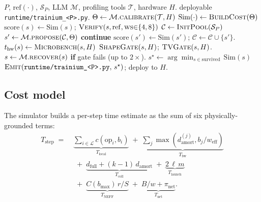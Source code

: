 \begin{algorithm}[!htbp]
\caption{End-to-end closed-stack collective-strategy search.}
\label{alg:pipeline}
\begin{algorithmic}[1]
\Require $P$, $\mathrm{ref}(\cdot)$, $\mathcal{S}_P$,
LLM $\mathcal{M}$, profiling tools $\mathcal{T}$, hardware $H$.
\Ensure deployable \texttt{runtime/trainium\_<P>.py}.
\smallskip
\State $\Theta \gets \mathcal{M}.\textsc{calibrate}(\mathcal{T}, H)$
\State $\mathrm{Sim}(\cdot) \gets \textsc{BuildCost}(\Theta)$
\smallskip
{}
  \State $\mathrm{score}(s) \gets \mathrm{Sim}(s)$;
  $\textsc{Verify}(s, \mathrm{ref}, \textsc{ws}{\in}\{4,8\})$
\EndFor
\smallskip
\State $\mathcal{C} \gets \textsc{InitPool}(\mathcal{S}_P)$
  \State $s' \gets \mathcal{M}.\textsc{propose}(\mathcal{C}, \Theta)$
   \textbf{continue} \EndIf
  \State $\mathrm{score}(s') \gets \mathrm{Sim}(s')$;
  $\mathcal{C} \gets \mathcal{C} \cup \{s'\}$.
\EndFor
\smallskip
{}
  \State $t_{\mathrm{hw}}(s) \gets \textsc{Microbench}(s, H)$
  \State $\textsc{ShapeGate}(s, H)$;
         $\textsc{TVGate}(s, H)$.
  \State $s \gets \mathcal{M}.\textsc{recover}(s)$ \textbf{if}
  gate fails (up to $2\times$).
\EndFor
\smallskip
\State $s^\star \gets \arg\min_{s \in \text{survived}}\,\mathrm{Sim}(s)$
\State $\textsc{Emit}(\texttt{runtime/trainium\_<P>.py},\, s^\star)$;
deploy to $H$.
\end{algorithmic}
\end{algorithm}

\subsection{Cost model}
\label{sec:cost}

The simulator builds a per-step time estimate as the sum of six
physically-grounded terms:
\begin{equation}
\label{eq:cost}
\begin{aligned}
T_{\text{step}} \;=\;
& \underbrace{\textstyle\sum_{i \in \mathcal{L}} c(\mathrm{op}_i, b_i)}_{T_{\text{local}}}
\;+\;
\underbrace{\textstyle\sum_{j} \max(d^{(j)}_{\text{amort}}, b_j / w_{\text{eff}})}_{T_{\text{bw}}} \\
& \;+\;
\underbrace{d_{\text{full}} + (k{-}1)\,d_{\text{amort}}}_{T_{\text{coll}}}
\;+\;
\underbrace{2\,\ell\,m}_{T_{\text{launch}}} \\
& \;+\;
\underbrace{C(b_{\max})\,r/S}_{T_{\text{NEFF}}}
\;+\;
\underbrace{B/w + \pi_{\text{net}}}_{T_{\text{net}}}.
\end{aligned}
\end{equation}
